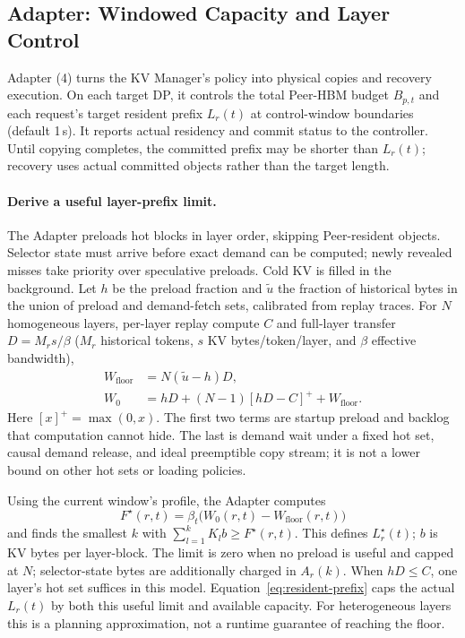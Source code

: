 \subsection{Adapter: Windowed Capacity and Layer Control}
\label{sec:kv-runtime}
\label{sec:capacity-allocation}

Adapter (4) turns the KV Manager's policy into physical copies and
recovery execution. On each target DP, it controls the total Peer-HBM
budget $B_{p,t}$ and each request's target resident prefix $L_r(t)$ at
control-window boundaries (default 1\,s). It reports actual residency
and commit status to the controller. Until copying completes, the
committed prefix may be shorter than $L_r(t)$; recovery uses actual
committed objects rather than the target length.



\paragraph{Derive a useful layer-prefix limit.}
The Adapter preloads hot blocks in layer order, skipping Peer-resident
objects. Selector state must arrive before exact demand can be computed;
newly revealed misses take priority over speculative preloads. Cold KV
is filled in the background. Let $h$ be the preload fraction and
$\widetilde u$ the fraction of historical bytes in the union of preload
and demand-fetch sets, calibrated from replay traces. For $N$ homogeneous
layers, per-layer replay compute $C$ and full-layer transfer
$D=M_rs/\beta$ ($M_r$ historical tokens, $s$ KV bytes/token/layer, and
$\beta$ effective bandwidth),
\begin{align}
 W_{\mathrm{floor}}&=N(\widetilde u-h)D,\label{eq:demand-floor}\\
 W_0&=hD+(N-1)[hD-C]^++W_{\mathrm{floor}}.\label{eq:exposed-wait}
\end{align}
Here $[x]^+=\max(0,x)$. The first two terms are startup preload and
backlog that computation cannot hide. The last is demand wait under a
fixed hot set, causal demand release, and ideal preemptible copy stream;
it is not a lower bound on other hot sets or loading policies.

Using the current window's profile, the Adapter computes
\begin{equation}
 F^\star(r,t)=\beta_t\bigl(W_0(r,t)-W_{\mathrm{floor}}(r,t)\bigr)
 \label{eq:peer-byte-target}
\end{equation}
and finds the smallest $k$ with $\sum_{l=1}^{k}K_lb\ge F^\star(r,t)$.
This defines $L_r^\star(t)$; $b$ is KV bytes per layer-block.
The limit is zero when no preload is useful and capped at $N$;
selector-state bytes are additionally charged in $A_r(k)$.
When $hD\le C$, one layer's hot set suffices in this model.
Equation~\ref{eq:resident-prefix} caps the actual $L_r(t)$ by both this
useful limit and available capacity. For heterogeneous layers this is
a planning approximation, not a runtime guarantee of reaching the floor.

